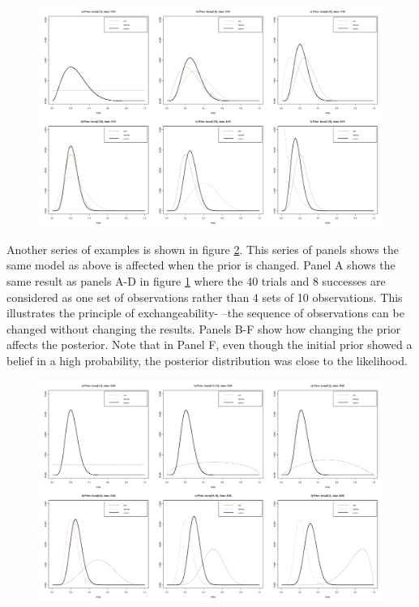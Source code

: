 \documentclass[USenglish,letterpaper,12pt,extrafontsizes,oneside,onecolumn,final]{memoir}
\begin{document}
\begin{figure}[t]
\begin{center}
\includegraphics[width=\textwidth]{model-fig-1}
\caption{\textsf{}\label{fig:model-fig-1}}
\end{center}
\end{figure}

Another series of examples is shown in figure \ref{fig:model-fig-2}.  This series of panels shows the same model as above is affected when the prior is changed.  Panel A shows the same result as panels A-D in figure \ref{fig:model-fig-1} where the 40 trials and 8 successes are considered as one set of observations rather than 4 sets of 10 observations.  This illustrates the principle of exchangeability- --the sequence of observations can be changed without changing the results.  Panels B-F show how changing the prior affects the posterior.  Note that in Panel F, even though the initial prior showed a belief in a high probability, the posterior distribution was close to the likelihood.
 
 \begin{figure}[t]
 \begin{center}
 \includegraphics[width=\textwidth]{model-fig-2}
 \caption{\textsf{}\label{fig:model-fig-2}}
 \end{center}
 \end{figure}
 
\end{document}
